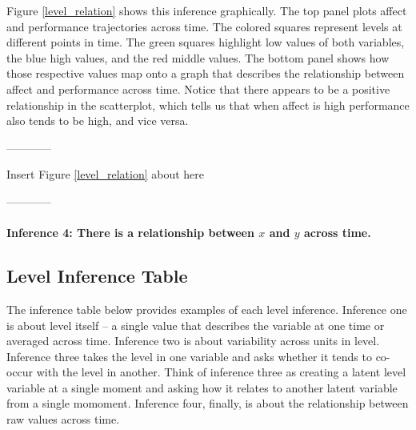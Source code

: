 \documentclass[english,,man]{apa6}
\let\oldparagraph\paragraph
\renewcommand{\paragraph}[1]{\oldparagraph{#1}\mbox{}}
\theoremstyle{definition}
\theoremstyle{definition}
\theoremstyle{definition}
\theoremstyle{remark}
\begin{document}
Figure \ref{level_relation} shows this inference graphically. The top
panel plots affect and performance trajectories across time. The colored
squares represent levels at different points in time. The green squares
highlight low values of both variables, the blue high values, and the
red middle values. The bottom panel shows how those respective values
map onto a graph that describes the relationship between affect and
performance across time. Notice that there appears to be a positive
relationship in the scatterplot, which tells us that when affect is high
performance also tends to be high, and vice versa.

\begin{center}

------------

Insert Figure \ref{level_relation} about here

------------

\end{center}

\hypertarget{inference-4-there-is-a-relationship-between-x-and-y-across-time.}{%
\paragraph{\texorpdfstring{Inference 4: There is a relationship between
\(x\) and \(y\) across
time.}{Inference 4: There is a relationship between x and y across time.}}\label{inference-4-there-is-a-relationship-between-x-and-y-across-time.}}

\hypertarget{level-inference-table}{%
\subsection{Level Inference Table}\label{level-inference-table}}

The inference table below provides examples of each level inference.
Inference one is about level itself -- a single value that describes the
variable at one time or averaged across time. Inference two is about
variability across units in level. Inference three takes the level in
one variable and asks whether it tends to co-occur with the level in
another. Think of inference three as creating a latent level variable at
a single moment and asking how it relates to another latent variable
from a single momoment. Inference four, finally, is about the
relationship between raw values across time.
\end{document}
